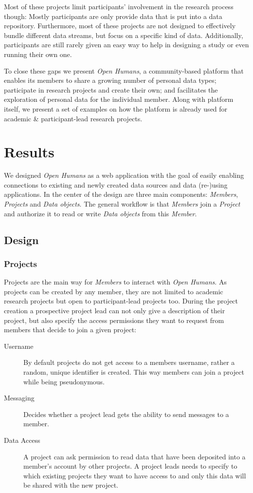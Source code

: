 \documentclass[a4paper,num-refs]{oup-contemporary}
\begin{document}
Most of these projects limit participants' involvement in the research process though: Mostly participants are only provide data that is put into a data repository. Furthermore, most of these projects are not designed to effectively bundle different data streams, but focus on a specific kind of data. Additionally, participants are still rarely given an easy way to help in designing a study or even running their own one. 

To close these gaps we present \textit{Open Humans}, a community-based platform that enables its members to share a growing number of personal data types; participate in research projects and create their own; and facilitates the exploration of personal data for the individual member. Along with platform itself, we present a set of examples on how the platform is already used for academic \& participant-lead research projects.

\section{Results}
We designed \textit{Open Humans} as a web application with the goal of easily enabling connections to existing and newly created data sources and data (re-)using applications. In the center of the design are three main components: \textit{Members}, \textit{Projects} and \textit{Data objects}. The general workflow is that \textit{Members} join a \textit{Project} and authorize it to read or write \textit{Data objects} from this \textit{Member}. 

\subsection{Design}
\subsubsection{Projects}
Projects are the main way for \textit{Members} to interact with \textit{Open Humans}. As projects can be created by any member, they are not limited to academic research projects but open to participant-lead projects too. During the project creation a prospective project lead can not only give a description of their project, but also specify the access permissions they want to request from members that decide to join a given project: 
\begin{description}
\item [Username] By default projects do not get access to a members username, rather a random, unique identifier is created. This way members can join a project while being pseudonymous. 
\item [Messaging] Decides whether a project lead gets the ability to send messages to a member. 
\item [Data Access] A project can ask permission to read data that have been deposited into a member's account by other projects. A project leads needs to specify to which existing projects they want to have access to and only this data will be shared with the new project.
\end{description}
\end{document}
